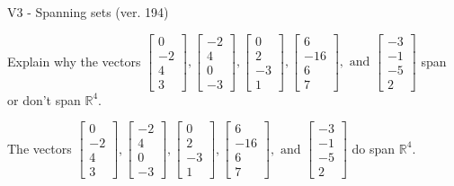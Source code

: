 \begin{exercise}
  \begin{exerciseTitle}V3 - Spanning sets (ver. 194)\end{exerciseTitle}
  \begin{exerciseStatement}
    Explain why the vectors \(\left[\begin{array}{r}
0 \\
-2 \\
4 \\
3
\end{array}\right] , \left[\begin{array}{r}
-2 \\
4 \\
0 \\
-3
\end{array}\right] , \left[\begin{array}{r}
0 \\
2 \\
-3 \\
1
\end{array}\right] , \left[\begin{array}{r}
6 \\
-16 \\
6 \\
7
\end{array}\right] , \text{ and } \left[\begin{array}{r}
-3 \\
-1 \\
-5 \\
2
\end{array}\right]\) span or don't span \(\mathbb{R}^4\). 
	


  \end{exerciseStatement}
  \begin{exerciseAnswer}
   The vectors \(\left[\begin{array}{r}
0 \\
-2 \\
4 \\
3
\end{array}\right] , \left[\begin{array}{r}
-2 \\
4 \\
0 \\
-3
\end{array}\right] , \left[\begin{array}{r}
0 \\
2 \\
-3 \\
1
\end{array}\right] , \left[\begin{array}{r}
6 \\
-16 \\
6 \\
7
\end{array}\right] , \text{ and } \left[\begin{array}{r}
-3 \\
-1 \\
-5 \\
2
\end{array}\right]\) 
  	 do  
	span \(\mathbb{R}^4\).
  



\end{exerciseAnswer}
\end{exercise}
